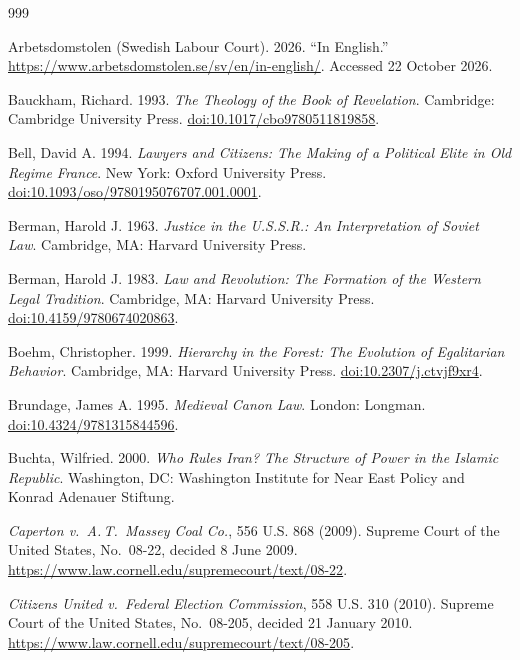 \documentclass[11pt,letterpaper]{article}
\theoremstyle{definition}
\theoremstyle{remark}
\begin{document}
\begin{thebibliography}{999}
\small
\raggedright

Arbetsdomstolen (Swedish Labour Court). 2026. ``In English.'' \url{https://www.arbetsdomstolen.se/sv/en/in-english/}. Accessed 22 October 2026.

Bauckham, Richard. 1993. \emph{The Theology of the Book of Revelation}. Cambridge: Cambridge University Press. \href{https://doi.org/10.1017/cbo9780511819858}{doi:10.1017/cbo9780511819858}.

Bell, David A. 1994. \emph{Lawyers and Citizens: The Making of a Political Elite in Old Regime France}. New York: Oxford University Press. \href{https://doi.org/10.1093/oso/9780195076707.001.0001}{doi:10.1093/oso/9780195076707.001.0001}.

Berman, Harold J. 1963. \emph{Justice in the U.S.S.R.: An Interpretation of Soviet Law}. Cambridge, MA: Harvard University Press.

Berman, Harold J. 1983. \emph{Law and Revolution: The Formation of the Western Legal Tradition}. Cambridge, MA: Harvard University Press. \href{https://doi.org/10.4159/9780674020863}{doi:10.4159/9780674020863}.

Boehm, Christopher. 1999. \emph{Hierarchy in the Forest: The Evolution of Egalitarian Behavior}. Cambridge, MA: Harvard University Press. \href{https://doi.org/10.2307/j.ctvjf9xr4}{doi:10.2307/j.ctvjf9xr4}.

Brundage, James A. 1995. \emph{Medieval Canon Law}. London: Longman. \href{https://doi.org/10.4324/9781315844596}{doi:10.4324/9781315844596}.

Buchta, Wilfried. 2000. \emph{Who Rules Iran? The Structure of Power in the Islamic Republic}. Washington, DC: Washington Institute for Near East Policy and Konrad Adenauer Stiftung.

\emph{Caperton v.\ A.\,T.\ Massey Coal Co.}, 556 U.S. 868 (2009). Supreme Court of the United States, No.~08-22, decided 8 June 2009. \url{https://www.law.cornell.edu/supremecourt/text/08-22}.

\emph{Citizens United v.\ Federal Election Commission}, 558 U.S. 310 (2010). Supreme Court of the United States, No.~08-205, decided 21 January 2010. \url{https://www.law.cornell.edu/supremecourt/text/08-205}.


\end{thebibliography}
\end{document}
